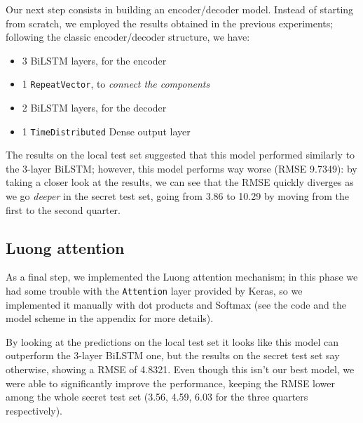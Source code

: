 \documentclass[10.5pt,a4paper,twocolumn]{article}
\begin{document}
Our next step consists in building an encoder/decoder model. Instead of starting from 
scratch, we employed the results obtained in the previous experiments; following the
classic encoder/decoder structure, we have:
\begin{itemize}
    \item 3 BiLSTM layers, for the encoder
    \item 1 \texttt{RepeatVector}, to \textit{connect the components}
    \item 2 BiLSTM layers, for the decoder
    \item 1 \texttt{TimeDistributed} Dense output layer
\end{itemize}

The results on the local test set suggested that this model performed similarly to the 
3-layer BiLSTM; however, this model performs way worse (RMSE 9.7349): by taking a closer look
at the results, we can see that the RMSE quickly diverges as we go \textit{deeper} in the
secret test set, going from 3.86 to 10.29 by moving from the first to the second quarter.

\subsection{Luong attention}
As a final step, we implemented the Luong attention mechanism; in this phase we had
some trouble with the \texttt{Attention} layer provided by Keras, so we implemented
it manually with dot products and Softmax (see the code and the model scheme in the appendix for more details).

By looking at the predictions on the local test set it looks like this model can outperform the 3-layer BiLSTM one,
but the results on the secret test set say otherwise, showing a RMSE of 4.8321. Even though this isn't our best model,
we were able to significantly improve the performance, keeping the RMSE lower among the whole secret test set 
(3.56, 4.59, 6.03 for the three quarters respectively).
\end{document}
